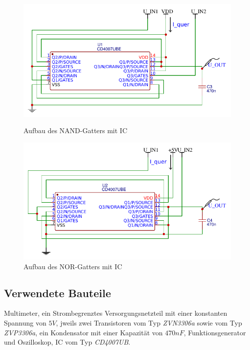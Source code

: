 \documentclass[11pt, a4paper]{article}
\begin{document}
\begin{figure}[htb]
    \centering
    \begin{minipage}[t]{0.45\linewidth}
        \centering
        \includegraphics[width=\linewidth]{IC_NAND.pdf}
        \caption{Aufbau des NAND-Gatters mit IC}
        \label{aufbauNANDIC}
    \end{minipage}%
    \hfill
    \begin{minipage}[t]{0.45\linewidth}
        \centering
        \includegraphics[width=\linewidth]{IC_NOR.pdf}
        \caption{Aufbau des NOR-Gatters mit IC}
        \label{aufbauNORIC}
    \end{minipage}
\end{figure}
\subsection*{Verwendete Bauteile}
Multimeter, ein Strombegrenztes Versorgungsnetzteil mit einer konstanten Spannung von $5V$, jweils zwei Transistoren vom Typ \textit{ZVN3306a} sowie vom Typ \textit{ZVP3306a}, ein Kondensator mit einer Kapazität von $470nF$, Funktionsgenerator und Oszilloskop, IC vom Typ \textit{CD4007UB}.
\end{document}
